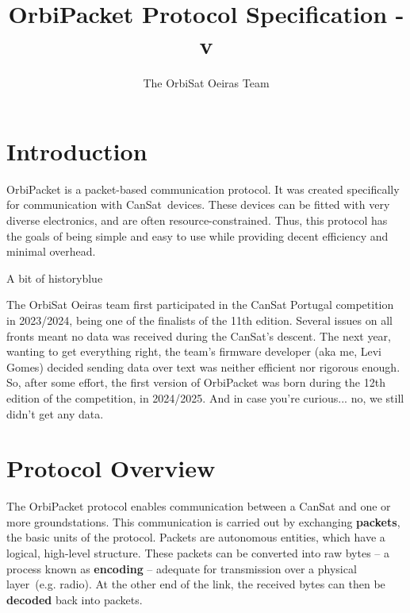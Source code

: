 \documentclass[a4paper,11pt,english]{article}
\title{OrbiPacket Protocol Specification - v\version}
\author{The OrbiSat Oeiras Team}
\date{}
\def\notebox#1#2{
  \begin{admobox}{#1}{blue}
  #2
  \end{admobox}
}
\begin{document}
\maketitle

\tableofcontents
\newpage

\section[intro]{Introduction}

OrbiPacket is a packet-based communication protocol. It was created specifically for communication with CanSat\footnotemark\ devices. These devices can be fitted with very diverse electronics, and are often resource-constrained. Thus, this protocol has the goals of being simple and easy to use while providing decent efficiency and minimal overhead.


\notebox{A bit of history}{
  The OrbiSat Oeiras team first participated in the CanSat Portugal competition in 2023/2024, being one of the finalists of the 11th edition. Several issues on all fronts meant no data was received during the CanSat's descent. The next year, wanting to get everything right, the team's firmware developer (aka me, Levi Gomes) decided sending data over text was neither efficient nor rigorous enough. So, after some effort, the first version of OrbiPacket was born during the 12th edition of the competition, in 2024/2025. And in case you're curious... no, we still didn't get any data.
}

\section[overview]{Protocol Overview}
The OrbiPacket protocol enables communication between a CanSat and one or more groundstations. This communication is carried out by exchanging \textbf{packets}, the basic units of the protocol. Packets are autonomous entities, which have a logical, high-level structure. These packets can be converted into raw bytes -- a process known as \textbf{encoding} -- adequate for transmission over a physical layer\footnotemark\ (e.g. radio). At the other end of the link, the received bytes can then be \textbf{decoded} back into packets.
\end{document}
